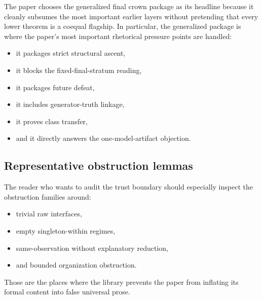 \documentclass[11pt,a4paper]{article}
\theoremstyle{definition}
\begin{document}
The paper chooses the generalized final crown package as its headline because it cleanly subsumes the most important earlier layers without pretending that every lower theorem is a coequal flagship. In particular, the generalized package is where the paper's most important rhetorical pressure points are handled:
\begin{itemize}[leftmargin=2em]
\item it packages strict structural ascent,
\item it blocks the fixed-final-stratum reading,
\item it packages future defeat,
\item it includes generator-truth linkage,
\item it proves class transfer,
\item and it directly answers the one-model-artifact objection.
\end{itemize}

\subsection{Representative obstruction lemmas}

The reader who wants to audit the trust boundary should especially inspect the obstruction families around:
\begin{itemize}[leftmargin=2em]
\item trivial raw interfaces,
\item empty singleton-within regimes,
\item same-observation without explanatory reduction,
\item and bounded organization obstruction.
\end{itemize}

Those are the places where the library prevents the paper from inflating its formal content into false universal prose.



\end{document}

